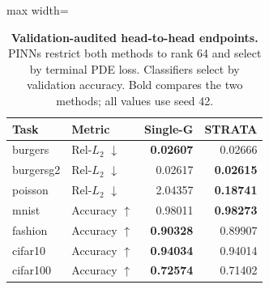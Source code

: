 

\begin{table}[htbp]
\centering
\caption{\textbf{Validation-audited head-to-head endpoints.} PINNs restrict both methods to rank 64 and select by terminal PDE loss. Classifiers select by validation accuracy. Bold compares the two methods; all values use seed 42.}
\label{tab:head-audited}
\begin{adjustbox}{max width=\linewidth}
\begin{tabular}{llrr}
\toprule
Task & Metric & Single-G & STRATA \\
\midrule
burgers & Rel-$L_2$ $\downarrow$ & \textbf{0.02607} & \cellcolor{oursbg}0.02666 \\
burgersg2 & Rel-$L_2$ $\downarrow$ & 0.02617 & \cellcolor{oursbg}\textbf{0.02615} \\
poisson & Rel-$L_2$ $\downarrow$ & 2.04357 & \cellcolor{oursbg}\textbf{0.18741} \\
mnist & Accuracy $\uparrow$ & 0.98011 & \cellcolor{oursbg}\textbf{0.98273} \\
fashion & Accuracy $\uparrow$ & \textbf{0.90328} & \cellcolor{oursbg}0.89907 \\
cifar10 & Accuracy $\uparrow$ & \textbf{0.94034} & \cellcolor{oursbg}0.94014 \\
cifar100 & Accuracy $\uparrow$ & \textbf{0.72574} & \cellcolor{oursbg}0.71402 \\
\bottomrule
\end{tabular}
\end{adjustbox}
\end{table}


